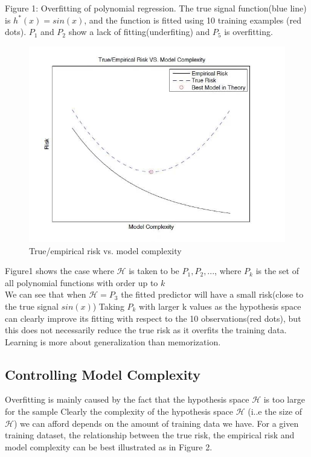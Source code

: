 \noindent Figure 1: Overfitting of polynomial regression. The true signal function(blue line) is $h^*(x)= sin(x)$, and
the function is fitted using 10 training examples (red dots). $P_1$ and $P_2$ show a lack of fitting(underfiting) and $P_5$ is overfitting.
\begin{figure}[htbp]
	\centering
	\includegraphics[width=0.8\linewidth]{6DL/figures/overfitting2.jpeg}
	\caption{True/empirical risk vs. model complexity}
	\label{Overfitting2}
\end{figure}

\noindent Figure1 shows the case where $\mathcal{H}$ is taken to be $P_1, P_2,...$, where $P_k$ is the set of all polynomial functions with order up to $k$\\

\noindent We can see that when $\mathcal{H}=P_3$ the fitted predictor will have a small risk(close to the true signal $sin(x)$)
Taking $P_k$ with larger k values as the hypothesis space can clearly improve its fitting with respect to the
10 observations(red dots), but this does not necessarily reduce the true risk as it overfits the training data.
Learning is more about generalization than memorization.

\subsection{Controlling Model Complexity}
Overfitting is mainly caused by the fact that the hypothesis space $\mathcal{H}$ is too large for the sample
Clearly the complexity of the hypothesis space $\mathcal{H}$ (i..e the size of $\mathcal{H}$) we can afford depends on the amount
of training data we have. For a given training dataset, the relationship between the true risk, the empirical
risk and model complexity can be best illustrated as in Figure 2.\\

